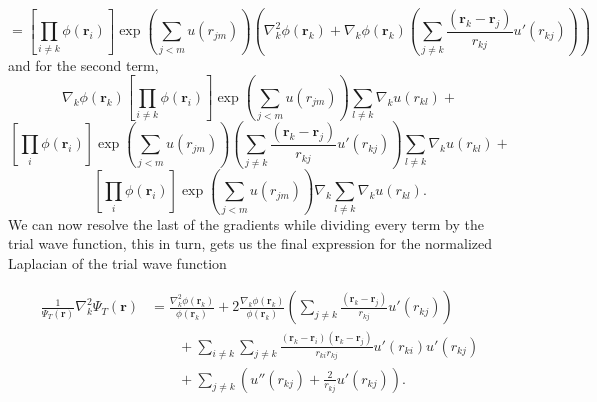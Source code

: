 \documentclass[11pt,a4paper,titlepage]{article}
\begin{document}
\begin{equation*}
= \left[\prod_{i\ne k}\phi(\mathbf{r}_i)\right]\exp{\left(\sum_{j<m}u(r_{jm})\right)}\left( \nabla_k^2\phi(\mathbf{r}_k)  + \nabla_k\phi(\mathbf{r}_k)\left(\sum_{j\ne k}\frac{(\mathbf{r}_k-\mathbf{r}_j)}{r_{kj}}u'(r_{kj})\right)\right)
\end{equation*}
and for the second term, 
\begin{equation*}
\nabla_k\phi(\mathbf{r}_k)\left[\prod_{i\ne k}\phi(\mathbf{r}_i)\right]\exp{\left(\sum_{j<m}u(r_{jm})\right)}\sum_{l\ne k}\nabla_k u(r_{kl}) + 
\end{equation*}
\begin{equation*}
\left[\prod_{i}\phi(\mathbf{r}_i)\right]\exp{\left(\sum_{j<m}u(r_{jm})\right)}\left(\sum_{j\ne k}\frac{(\mathbf{r}_k-\mathbf{r}_j)}{r_{kj}}u'(r_{kj})\right)\sum_{l\ne k}\nabla_k u(r_{kl}) + 
\end{equation*}
\begin{equation*}
\left[\prod_i\phi(\mathbf{r}_i)\right]
  \exp{\left(\sum_{j<m}u(r_{jm})\right)}\nabla_k\sum_{l\ne k}\nabla_k u(r_{kl}).
\end{equation*}
We can now resolve the last of the gradients while dividing every term by the trial wave function, this in turn, gets us the final expression for the normalized Laplacian of the trial wave function

\begin{align}
   \frac{1}{\Psi_T(\mathbf{r})}\nabla_k^2\Psi_T(\mathbf{r})
   &= \frac{\nabla_k^2\phi(\mathbf{r}_k)}{\phi(\mathbf{r}_k)}
   + 2\frac{\nabla_k\phi(\mathbf{r}_k)}{\phi(\mathbf{r}_k)}
   \left(\sum_{j\ne k}\frac{(\mathbf{r}_k-\mathbf{r}_j)}{r_{kj}}u'(r_{kj})\right)
   \\
   &\qquad
   + \sum_{i\ne k}\sum_{j \ne k}\frac{(\mathbf{r}_k-\mathbf{r}_i)(\mathbf{r}_k-\mathbf{r}_j)}{r_{ki}r_{kj}}u'(r_{ki})u'(r_{kj})
   \\
   &\qquad
   + \sum_{j\ne k}\left( u''(r_{kj})+\frac{2}{r_{kj}}u'(r_{kj})\right).
\end{align}


\end{document}
